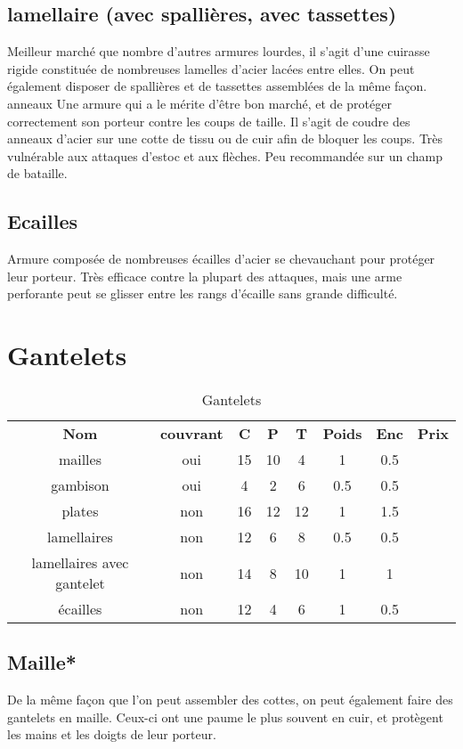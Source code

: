 \documentclass[10pt,a4paper,twocolumn]{book}
\begin{document}
\subsection*{lamellaire (avec spallières, avec tassettes)}
Meilleur marché que nombre d'autres armures lourdes, il s'agit d'une cuirasse rigide constituée de nombreuses lamelles d'acier lacées entre elles. On peut également disposer de spallières et de tassettes assemblées de la même façon.
anneaux
Une armure qui a le mérite d'être bon marché, et de protéger correctement son porteur contre les coups de taille. Il s'agit de coudre des anneaux d'acier sur une cotte de tissu ou de cuir afin de bloquer les coups. Très vulnérable aux attaques d'estoc et aux flèches. Peu recommandée sur un champ de bataille.
\subsection*{Ecailles}
Armure composée de nombreuses écailles d'acier se chevauchant pour protéger leur porteur. Très efficace contre la plupart des attaques, mais une arme perforante peut se glisser entre les rangs d'écaille sans grande difficulté.
\section{Gantelets}
\begin{table*}
\caption{Gantelets}
\label{tablegantelets}
\begin{tabular}{cccccccc}
\textbf{Nom}&\textbf{couvrant}&\textbf{C}&\textbf{P}&\textbf{T}&\textbf{Poids}&\textbf{Enc}&\textbf{Prix}\\
mailles & oui & 15 & 10 & 4 & 1 & 0.5 \\
gambison & oui & 4 & 2 & 6 & 0.5 & 0.5 \\
plates & non & 16 & 12 & 12 &1 & 1.5 \\
lamellaires & non & 12 & 6 & 8 & 0.5 & 0.5 \\
lamellaires avec gantelet &non & 14 &8 & 10 & 1 & 1\\
écailles & non & 12 & 4 & 6 & 1 & 0.5 \\
\end{tabular}
\end{table*}
\subsection*{Maille*}
De la même façon que l'on peut assembler des cottes, on peut également faire des gantelets en maille. Ceux-ci ont une paume le plus souvent en cuir, et protègent les mains et les doigts de leur porteur.
\end{document}
